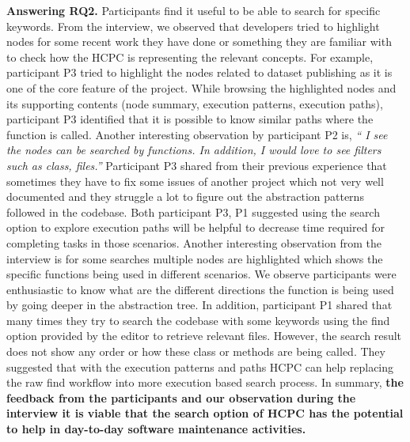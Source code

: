 \textbf{Answering RQ2.} Participants find it useful to be able to search for specific keywords. From the interview, we observed that developers tried to highlight nodes for some recent work they have done or something they are familiar with to check how the HCPC is representing the relevant concepts. For example, participant P3 tried to highlight the nodes related to dataset publishing as it is one of the core feature of the project. While browsing the highlighted nodes and its supporting contents (node summary, execution patterns, execution paths), participant P3 identified that it is possible to know similar paths where the function is called. Another interesting observation by participant P2 is, \emph{`` I see the nodes can be searched by functions. In addition, I would love to see filters such as class, files.''} Participant P3 shared from their previous experience that sometimes they have to fix some issues of another project which not very well documented and they struggle a lot to figure out the abstraction patterns followed in the codebase. Both participant P3, P1 suggested using the search option to explore execution paths will be helpful to decrease time required for completing tasks in those scenarios. Another interesting observation from the interview is for some searches multiple nodes are highlighted which shows the specific functions being used in different scenarios. We observe participants were enthusiastic to know what are the different directions the function is being used by going deeper in the abstraction tree. In addition, participant P1 shared that many times they try to search the codebase with some keywords using the find option provided by the editor to retrieve relevant files. However, the search result does not show any order or how these class or methods are being called. They suggested that with the execution patterns and paths HCPC can help replacing the raw find workflow into more execution based search process. In summary, \textbf{the feedback from the participants and our observation during the interview it is viable that the search option of  HCPC has the potential to help in day-to-day software maintenance activities. } 



